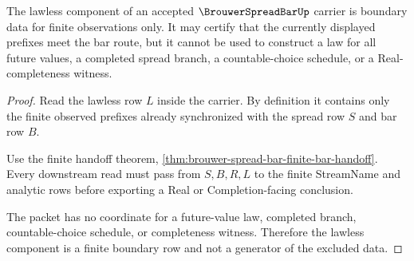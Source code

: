 \begin{theorem}
\label{thm:brouwer-spread-bar-lawless-boundary}
The lawless component of an accepted $\BrouwerSpreadBarUp$ carrier is boundary data for finite observations only. It may certify that the currently displayed prefixes meet the bar route, but it cannot be used to construct a law for all future values, a completed spread branch, a countable-choice schedule, or a Real-completeness witness.
\end{theorem}
\begin{proof}
Read the lawless row $L$ inside the carrier. By definition it contains only the finite observed prefixes already synchronized with the spread row $S$ and bar row $B$.

Use the finite handoff theorem, \autoref{thm:brouwer-spread-bar-finite-bar-handoff}. Every downstream read must pass from $S,B,R,L$ to the finite StreamName and analytic rows before exporting a Real or Completion-facing conclusion.

The packet has no coordinate for a future-value law, completed branch, countable-choice schedule, or completeness witness. Therefore the lawless component is a finite boundary row and not a generator of the excluded data.
\end{proof}


\begin{closurestatus}{\BrouwerSpreadBarUp}
  \theoryclosure{\seedClosure}
  \formalstatus{\unformalizedV}
\end{closurestatus}
